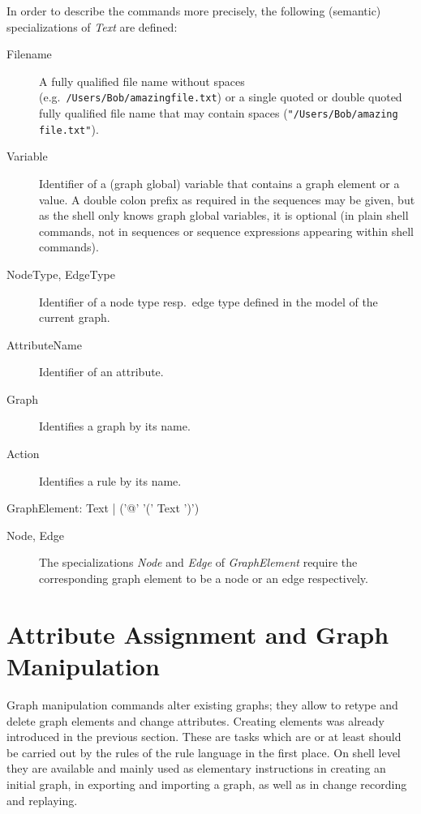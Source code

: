 In order to describe the commands more precisely, the following (semantic) specializations of \emph{Text} are defined:
\begin{description}
  \item[Filename]A fully qualified file name without spaces (e.g.\ \texttt{/Users/Bob/amazing\textunderscore file.txt}) or a single quoted or double quoted fully qualified file name that may contain spaces (\texttt{"/Users/Bob/amazing file.txt"}).
  \item[Variable] Identifier of a (graph global) variable that contains a graph element or a value.  A double colon prefix as required in the sequences may be given, but as the shell only knows graph global variables, it is optional (in plain shell commands, not in sequences or sequence expressions appearing within shell commands).
  \item[NodeType, EdgeType] Identifier of a node type resp.\ edge type defined in the model of the current graph.
  \item[AttributeName] Identifier of an attribute.
  \item[Graph] Identifies a graph by its name.
  \item[Action] Identifies a rule by its name.
\end{description}
\makeatletter
\begin{rail}
  GraphElement: Text | ('@' '(' Text ')')
\end{rail}
\makeatother
\begin{description}
  \item[Node, Edge] The specializations \emph{Node} and \emph{Edge} of \emph{GraphElement} require the corresponding graph element to be a node or an edge respectively.
\end{description}


\section{Attribute Assignment and Graph Manipulation}
\label{mani}
Graph manipulation commands alter existing graphs;
they allow to retype and delete graph elements and change attributes.
Creating elements was already introduced in the previous section.
These are tasks which are or at least should be carried out by the rules of the rule language in the first place.
On shell level they are available and mainly used as elementary instructions in creating an initial graph, in exporting and importing a graph, as well as in change recording and replaying.

